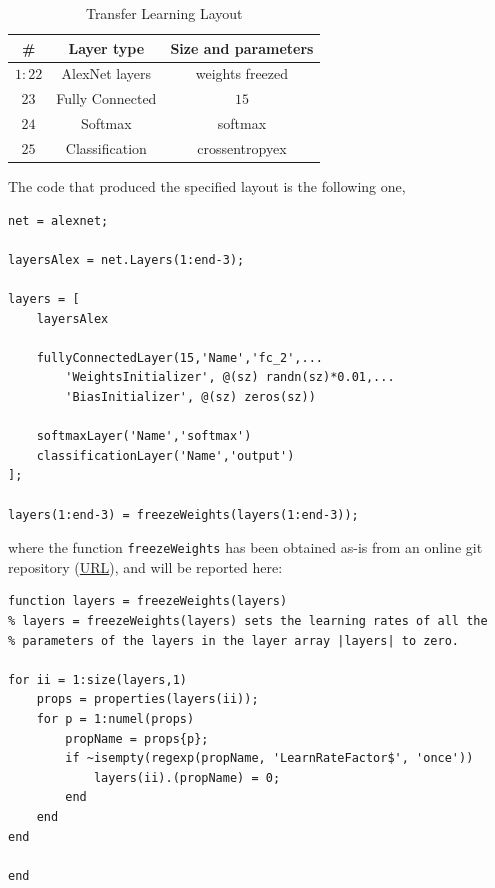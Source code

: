 \documentclass[a4paper, 11pt]{article} %
\begin{document}
\bigskip
\begin{table}[ht]
\centering
\begin{tabular}{|c|c|c|}
\hline 
\textbf{\#} & \textbf{Layer type} & \textbf{Size and parameters} \\
\hline \hline 
$1:22$ & AlexNet layers & weights freezed \\
\hline 
$23$ & Fully Connected & $15$ \\
\hline
$24$ & Softmax & softmax \\ 
\hline 
$25$ & Classification & crossentropyex \\
\hline
\end{tabular}
\caption{Transfer Learning Layout}\label{tab:transfer-learning-layout-1}
\end{table}
\bigskip

The code that produced the specified layout is the following one,

\begin{lstlisting}
net = alexnet;

layersAlex = net.Layers(1:end-3);

layers = [
    layersAlex

    fullyConnectedLayer(15,'Name','fc_2',...
        'WeightsInitializer', @(sz) randn(sz)*0.01,...
        'BiasInitializer', @(sz) zeros(sz))

    softmaxLayer('Name','softmax')
    classificationLayer('Name','output')
];

layers(1:end-3) = freezeWeights(layers(1:end-3));
\end{lstlisting}

where the function \texttt{freezeWeights} has been obtained as-is from an online git repository (\href{https://github.com/GRSEB9S/Transfer-Learning-using-Matlab/blob/master/TransferLearningUsingResNet101Example/freezeWeights.m}{URL}), and will be reported here:

\begin{lstlisting}
function layers = freezeWeights(layers)
% layers = freezeWeights(layers) sets the learning rates of all the
% parameters of the layers in the layer array |layers| to zero.

for ii = 1:size(layers,1)
    props = properties(layers(ii));
    for p = 1:numel(props)
        propName = props{p};
        if ~isempty(regexp(propName, 'LearnRateFactor$', 'once'))
            layers(ii).(propName) = 0;
        end
    end
end

end
\end{lstlisting}
\end{document}

